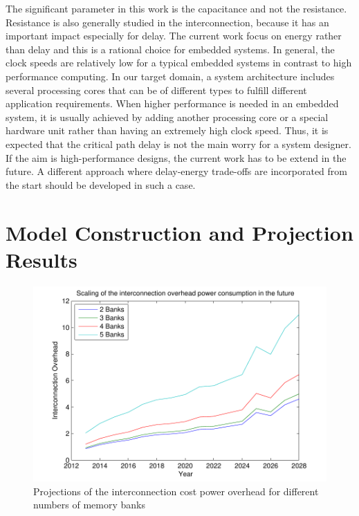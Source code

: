 The significant parameter in this work is the capacitance and not the resistance.
Resistance is also generally studied in the interconnection, because it has an important impact especially for
delay. 
The current work focus on energy rather than delay and this is a rational choice for embedded systems.
In general, the clock speeds are relatively low for a typical embedded systems in contrast to high performance computing.
In our target domain, a system architecture includes several processing cores that can be of different types to fulfill different application requirements.
When higher performance is needed in an embedded system, it is usually achieved by adding another processing core or a special hardware unit rather than having an extremely high clock speed.
Thus, it is expected that the critical path delay is not the main worry for a system designer.
If the aim is high-performance designs, the current work has to be extend in the future.
A different approach where delay-energy trade-offs are incorporated
from the start should be developed in such a case.

\section{Model Construction and Projection Results}

 \begin{figure}
 \centering
 \includegraphics[width = \textwidth]{E/overhead.pdf}
  \caption{Projections of the interconnection cost power overhead for different numbers of memory banks}
 \label{fig:overheadE}
 \end{figure}

